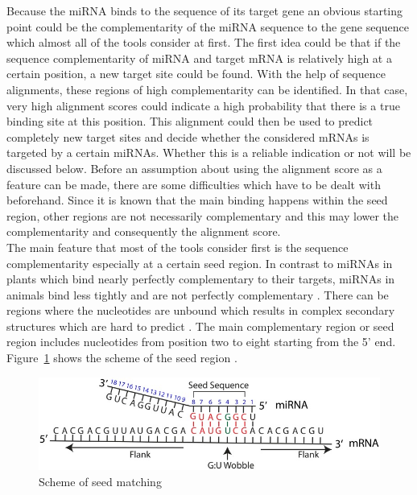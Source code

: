 \documentclass[11pt, a4paper, oneside]{book}
\begin{document}
Because the miRNA binds to the sequence of its target gene an obvious starting point could be the complementarity of the miRNA sequence to the gene sequence which almost all of the tools consider at first. The first idea could be that if the sequence complementarity of miRNA and target mRNA is relatively high at a certain position, a new target site could be found. With the help of sequence alignments, these regions of high complementarity can be identified. In that case, very high alignment scores could indicate a high probability that there is a true binding site at this position. This alignment could then be used to predict completely new target sites and decide whether the considered mRNAs is targeted by a certain miRNAs. Whether this is a reliable indication or not will be discussed below. Before an assumption about using the alignment score as a feature can be made, there are some difficulties which have to be dealt with beforehand. Since it is known that the main binding happens within the seed region, other regions are not necessarily complementary and this may lower the complementarity and consequently the alignment score. \\

The main feature that most of the tools consider first is the sequence complementarity especially at a certain seed region. In contrast to miRNAs in plants which bind nearly perfectly complementary to their targets, miRNAs in animals bind less tightly and are not perfectly complementary \cite{Rhoades}. There can be regions where the nucleotides are unbound which results in complex secondary structures which are hard to predict \cite{Rehmsmeier}. The main complementary region or seed region includes nucleotides from position two to eight starting from the 5' end. Figure~\ref{seed} shows the scheme of the seed region \cite{Peterson}. \\


\begin{figure}[h]
\centering
\includegraphics[scale=2.8]{results/seedmatching.png} 
\caption{Scheme of seed matching}
\label{seed}
\end{figure}
\end{document}
